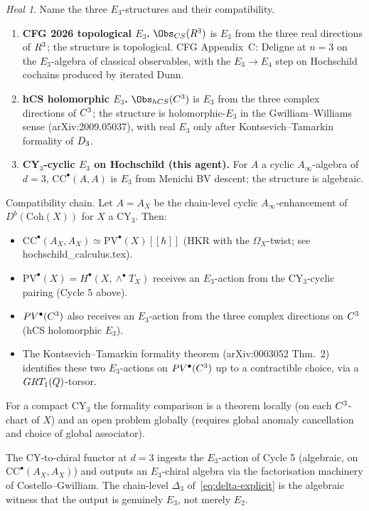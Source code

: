 \documentclass[11pt]{article}
\theoremstyle{definition}
\theoremstyle{remark}
\newtheorem*{heal}{Heal}
\newcommand{\CC}{\mathrm{CC}}
\newcommand{\Ainf}{A_{\infty}}
\begin{document}
\begin{heal}
Name the three $E_3$-structures and their compatibility.

\begin{enumerate}
\item \textbf{CFG 2026 topological $E_3$.} $\Obs_{\mathrm{CS}}(\R^3)$
is $E_3$ from the three real directions of $R^3$; the structure is
topological. CFG Appendix~C: Deligne at $n=3$ on the $E_3$-algebra
of classical observables, with the $E_3 \to E_4$ step on Hochschild
cochains produced by iterated Dunn.

\item \textbf{hCS holomorphic $E_3$.} $\Obs_{\mathrm{hCS}}(\C^3)$ is
$E_3$ from the three complex directions of $C^3$; the structure is
holomorphic-$E_3$ in the Gwilliam--Williams sense
(arXiv:2009.05037), with real $E_3$ only after
Kontsevich--Tamarkin formality of $D_3$.

\item \textbf{CY$_3$-cyclic $E_3$ on Hochschild (this agent).} For
$A$ a cyclic $\Ainf$-algebra of $d = 3$, $\CC^\bullet(A,A)$ is $E_3$
from Menichi BV descent; the structure is algebraic.
\end{enumerate}

Compatibility chain. Let $A = A_X$ be the chain-level cyclic
$\Ainf$-enhancement of $D^b(\mathrm{Coh}(X))$ for $X$ a CY$_3$. Then:
\begin{itemize}
\item $\CC^\bullet(A_X, A_X) \simeq \mathrm{PV}^\bullet(X)
[[\hbar]]$ (HKR with the $\Omega_X$-twist; see
hochschild\_calculus.tex).
\item $\mathrm{PV}^\bullet(X) = H^\bullet(X, \wedge^\bullet T_X)$
receives an $E_3$-action from the CY$_3$-cyclic pairing (Cycle 5
above).
\item $PV^\bullet(C^3)$ also receives an $E_3$-action from
the three complex directions on $C^3$ (hCS holomorphic $E_3$).
\item The Kontsevich--Tamarkin formality theorem (arXiv:0003052
Thm.~2) identifies these two $E_3$-actions on $PV^\bullet
(C^3)$ up to a contractible choice, via a
$GRT_1(Q)$-torsor.
\end{itemize}

For a compact CY$_3$ the formality comparison is a theorem locally
(on each $C^3$-chart of $X$) and an open problem globally (requires
global anomaly cancellation and choice of global associator).

The CY-to-chiral functor at $d = 3$ ingests the $E_3$-action of
Cycle 5 (algebraic, on $\CC^\bullet(A_X, A_X)$) and outputs an
$E_3$-chiral algebra via the factorisation machinery of
Costello--Gwilliam. The chain-level $\Delta_3$
of~\eqref{eq:delta-explicit} is the algebraic witness that the
output is genuinely $E_3$, not merely $E_2$.
\end{heal}
\end{document}
